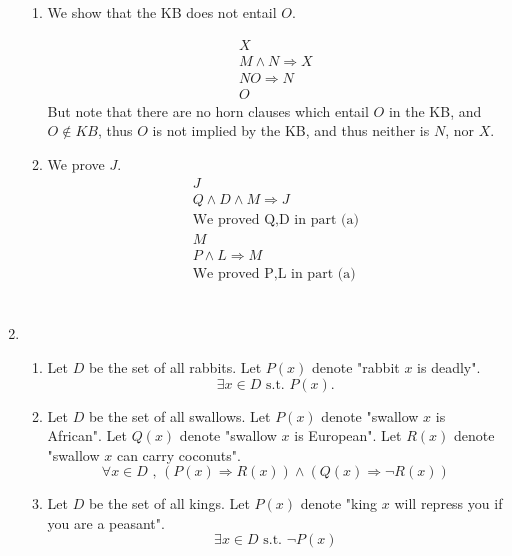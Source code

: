 \documentclass[10pt,oneside,reqno]{amsart}
\theoremstyle{plain}
\theoremstyle{definition}
\begin{document}
\begin{enumerate}[label=\arabic*.]
\begin{enumerate}[label=\alph*.]
\item We show that the KB does not entail $O$. 

\begin{equation}
\begin{aligned}
X\\
M \wedge N  \Rightarrow X\\
N
O  \Rightarrow N\\
O
\end{aligned}
\end{equation}
But note that there are no horn clauses which entail $O$ in the KB, and $O \notin KB$, thus $O$ is not implied by the KB, and thus neither is $N$, nor $X$. \\

\item We prove $J$. 
\begin{equation}
\begin{aligned}
J\\
Q \wedge D \wedge M  \Rightarrow J\\
\text{We proved Q,D in part (a)}\\
M\\
P \wedge L  \Rightarrow M\\
\text{We proved P,L in part (a)}\\
\end{aligned}
\end{equation}\\



\end{enumerate}

\item 

\begin{enumerate}[label=\alph*.]

\item Let $D$ be the set of all rabbits. Let $P(x)$ denote "rabbit $x$ is deadly".
\[\exists x \in D \text{ s.t. } P(x).\]

\item Let $D$ be the set of all swallows. Let $P(x)$ denote "swallow $x$ is African". Let $Q(x)$ denote "swallow $x$ is European". Let $R(x)$ denote "swallow $x$ can carry coconuts".
\[\forall x \in D \text{ , } (P(x) \Rightarrow R(x)) \wedge (Q(x) \Rightarrow \neg R(x))\]

\item Let $D$ be the set of all kings. Let $P(x)$ denote "king $x$ will repress you if you are a peasant". 
\[\exists x \in D \text{ s.t. } \neg P(x)\]


\end{enumerate}
\end{enumerate}
\end{document}
